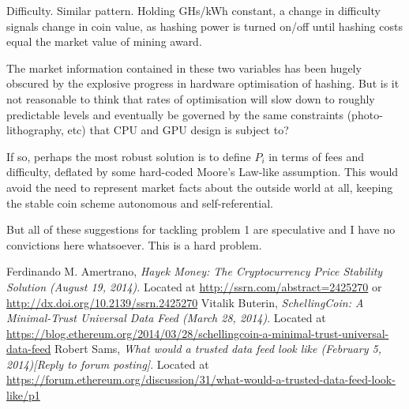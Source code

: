 \documentclass[twocolumn]{article}
\begin{document}
Difficulty. Similar pattern. Holding GHs/kWh constant, a change in
difficulty signals change in coin value, as hashing power is turned
on/off until hashing costs equal the market value of mining award. 

The market information contained in these two variables has been
hugely obscured by the explosive progress in hardware optimisation of
hashing. But is it not reasonable to think that rates of optimisation
will slow down to roughly predictable levels and eventually be
governed by the same constraints (photo-lithography, etc) that CPU and
GPU design is subject to? 

If so, perhaps the most robust solution is to define $P_{i}$ in terms
of fees and difficulty, deflated by some hard-coded Moore's Law-like
assumption. This would avoid the need to represent market facts about
the outside world at all, keeping the stable coin scheme autonomous
and self-referential. 

But all of these suggestions for tackling problem 1 are speculative
and I have no convictions here whatsoever. This is a hard problem.

\begin{thebibliography}{9}
Ferdinando M. Amertrano,
  \emph{Hayek Money: The Cryptocurrency Price Stability Solution
    (August 19, 2014)}.
Located at \url{http://ssrn.com/abstract=2425270} or
\url{http://dx.doi.org/10.2139/ssrn.2425270}
Vitalik Buterin, \emph{SchellingCoin: A Minimal-Trust Universal Data Feed (March 28,
  2014)}. Located at
\url{https://blog.ethereum.org/2014/03/28/schellingcoin-a-minimal-trust-universal-data-feed}
Robert Sams, \emph{What would a trusted data feed look like (February 5,
  2014)[Reply to forum posting]}. Located at \url{https://forum.ethereum.org/discussion/31/what-would-a-trusted-data-feed-look-like/p1}
  \end{thebibliography}
\end{document}
